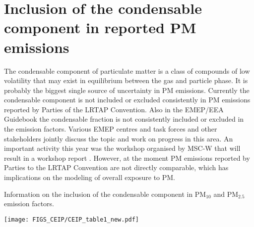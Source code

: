 \section{Inclusion of the condensable component in reported PM emissions}
\label{sec:EmisSVOC}

The condensable component of particulate matter is a class of compounds of low volatility that may exist in equilibrium between the gas and particle phase. It is probably the biggest single source of uncertainty in PM emissions.
Currently the condensable component is not included or excluded consistently in PM emissions reported by Parties
of the LRTAP Convention. Also in the EMEP/EEA Guidebook \citep{EmisInvGuide2019} the condensable fraction is not consistently included or
excluded in the emission factors. Various EMEP centres and task forces and other stakeholders jointly discuss the topic and work on progress in this area. An important activity this year was the workshop organised by MSC-W that will result in a workshop report \citep{NMR-SVOC}. However, at the moment PM emissions reported by Parties to the LRTAP Convention are not directly
comparable, which has implications on the modeling of overall exposure to PM.



\begin{table}
  \caption{Information on the inclusion of the condensable component in PM$_{10}$ and PM$_{2.5}$ emission factors.}
\centering
{\texttt{[image: FIGS\_CEIP/CEIP\_table1\_new.pdf]}}
\label{tab:CEIP1}  
\end{table}


